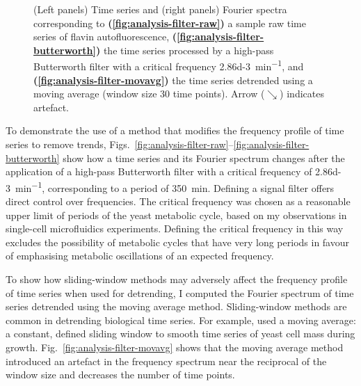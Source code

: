 \begin{figure}
  \caption[
    Time series and Fourier spectra corresponding to
    a sample raw time series of flavin autofluorescence,
    the time series processed by a high-pass Butterworth filter, and
    the time series detrended using a moving average.
  ]{
    (Left panels) Time series and (right panels) Fourier spectra corresponding to
    \textbf{(\ref{fig:analysis-filter-raw})}
    a sample raw time series of flavin autofluorescence,
    \textbf{(\ref{fig:analysis-filter-butterworth})}
    the time series processed by a high-pass Butterworth filter with a critical frequency \SI{2.86d-3}{\minute^{-1}}, and
    \textbf{(\ref{fig:analysis-filter-movavg})}
    the time series detrended using a moving average (window size 30 time points).
    Arrow ($\searrow$) indicates artefact.
  }
  \label{fig:analysis-filter}
\end{figure}

To demonstrate the use of a method that modifies the frequency profile of time series to remove trends, Figs.\ \ref{fig:analysis-filter-raw}--\ref{fig:analysis-filter-butterworth} show how a time series and its Fourier spectrum changes after the application of a high-pass Butterworth filter with a critical frequency of \SI{2.86d-3}{\minute^{-1}}, corresponding to a period of \SI{350}{\minute}.
Defining a signal filter offers direct control over frequencies.
The critical frequency was chosen as a reasonable upper limit of periods of the yeast metabolic cycle, based on my observations in single-cell microfluidics experiments.
Defining the critical frequency in this way excludes the possibility of metabolic cycles that have very long periods in favour of emphasising metabolic oscillations of an expected frequency.

To show how sliding-window methods may adversely affect the frequency profile of time series when used for detrending, I computed the Fourier spectrum of time series detrended using the moving average method.
Sliding-window methods are common in detrending biological time series.
For example, \textcite{cunyHighresolutionMassMeasurements2022} used a moving average: a constant, defined sliding window to smooth time series of yeast cell mass during growth.
%
Fig.\ \ref{fig:analysis-filter-movavg} shows that the moving average method introduced an artefact in the frequency spectrum near the reciprocal of the window size and decreases the number of time points.


